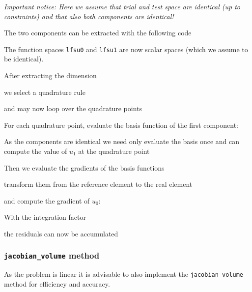 \documentclass[a4paper,12pt]{article}
\begin{document}
\textit{Important notice: Here we assume that trial and test space are identical
(up to constraints) and that also both components are identical!}

The two components can be extracted with the following code

The function spaces \lstinline{lfsu0} and \lstinline{lfsu1} are
now scalar spaces (which we assume to be identical).

After extracting the dimension

we select a quadrature rule

and may now loop over the quadrature points

For each quadrature point, evaluate the basis function
of the first component:

As the components are identical we need only evaluate the basis once
and can compute the value of $u_1$ at the quadrature point

Then we evaluate the gradients of the basis functions

transform them from the reference element to the real element

and compute the gradient of $u_0$:

With the integration factor

the residuals can now be accumulated


\subsubsection*{\lstinline{jacobian_volume} method}

As the problem is linear it is advisable to also implement the
\lstinline{jacobian_volume} method for efficiency and accuracy.
\end{document}
